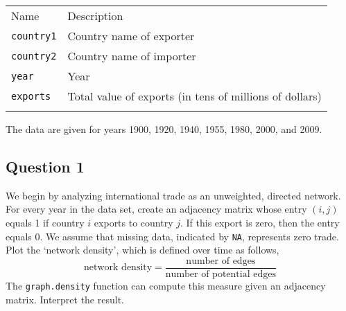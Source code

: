 \documentclass[]{article}
\begin{document}
\begin{longtable}[c]{@{}ll@{}}
\toprule\addlinespace
\begin{minipage}[b]{0.25\columnwidth}\raggedright
Name
\end{minipage} & \begin{minipage}[b]{0.68\columnwidth}\raggedright
Description
\end{minipage}
\\\addlinespace
\midrule\endhead
\begin{minipage}[t]{0.25\columnwidth}\raggedright
\texttt{country1}
\end{minipage} & \begin{minipage}[t]{0.68\columnwidth}\raggedright
Country name of exporter
\end{minipage}
\\\addlinespace
\begin{minipage}[t]{0.25\columnwidth}\raggedright
\texttt{country2}
\end{minipage} & \begin{minipage}[t]{0.68\columnwidth}\raggedright
Country name of importer
\end{minipage}
\\\addlinespace
\begin{minipage}[t]{0.25\columnwidth}\raggedright
\texttt{year}
\end{minipage} & \begin{minipage}[t]{0.68\columnwidth}\raggedright
Year
\end{minipage}
\\\addlinespace
\begin{minipage}[t]{0.25\columnwidth}\raggedright
\texttt{exports}
\end{minipage} & \begin{minipage}[t]{0.68\columnwidth}\raggedright
Total value of exports (in tens of millions of dollars)
\end{minipage}
\\\addlinespace
\bottomrule
\end{longtable}

The data are given for years 1900, 1920, 1940, 1955, 1980, 2000, and
2009.

\subsection{Question 1}\label{question-1}

We begin by analyzing international trade as an unweighted, directed
network. For every year in the data set, create an adjacency matrix
whose entry $(i,j)$ equals 1 if country $i$ exports to country $j$. If
this export is zero, then the entry equals 0. We assume that missing
data, indicated by \texttt{NA}, represents zero trade. Plot the `network
density', which is defined over time as follows, \[
    \text{network density}  =  \frac{\text{number of edges}}{\text{number of potential edges}}
  \] The \texttt{graph.density} function can compute this measure given
an adjacency matrix. Interpret the result.
\end{document}
